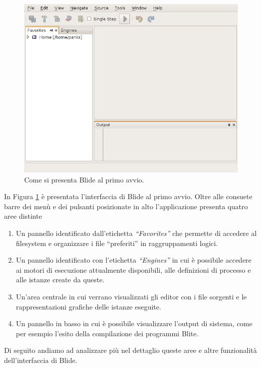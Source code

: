 \begin{figure}[t!]
\begin{center}
\includegraphics[scale=0.60]
{blide/dia/Blide1}
\caption[Blide Schermata]{Come si presenta Blide al primo avvio.}
  \label{fig:blide1}
\end{center}
\end{figure}
 
In Figura \ref{fig:blide1} è presentata l'interfaccia di Blide al primo avvio. 
Oltre alle consuete barre dei menù e dei pulsanti posizionate in alto
l'applicazione presenta quatro aree distinte

\begin{enumerate}
  \item Un pannello identificato dall'etichetta \emph{``Favorites''} che
  permette di accedere al filesystem e organizzare i file ``preferiti''
  in raggruppamenti logici.
  \item Un pannello identificato con l'etichetta \emph{``Engines''} in cui è
  possibile accedere ai motori di esecuzione attualmente disponibili, alle
  definizioni di processo e alle istanze create da queste.
  \item Un'area centrale in cui verrano visualizzati gli editor con i file
  sorgenti e le rappresentazioni grafiche delle istanze eseguite.
  \item Un pannello in basso in cui è possibile visualizzare l'output di
  sistema, come per esempio l'esito della compilazione dei programmi Blite.
\end{enumerate}

Di seguito andiamo ad analizzare più nel dettaglio queste aree e altre
funzionalità dell'interfaccia di Blide.

